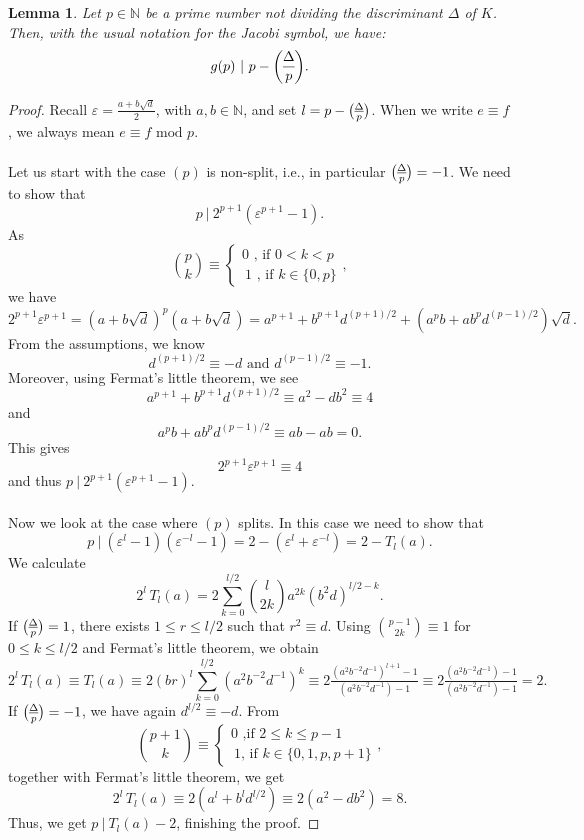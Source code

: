 \documentclass[11pt, a4paper]{amsart}
\newcommand{\ep}{\varepsilon}
\newcommand{\genlegendre}[4]{%
  \genfrac{(}{)}{}{#1}{#3}{#4}%
  \if\relax\detokenize{#2}\relax\else_{\!#2}\fi
}
\newcommand{\legendre}[3][]{\genlegendre{}{#1}{#2}{#3}}
\newcommand{\eq}[1]{\begin{equation}#1\end{equation}}
\theoremstyle{plain}
\newtheorem{lemma}{Lemma}[section]
\numberwithin{equation}{section}
\begin{document}
\begin{lemma}
\label{epsilonf}
Let $p \in \mathbb N$ be a prime number not dividing the discriminant $\Delta$ of $K$. Then, with the usual notation for the Jacobi symbol, we have: \eq{g(p) \ \vert \ p-\legendre{\Delta}{p}.}
\end{lemma}
\begin{proof}
Recall $\ep = \tfrac{a + b\sqrt{d} } 2$, with $a,b \in \mathbb N$, and set $l = p-\legendre{\Delta}{p}$. When we write $e\equiv f$, we always mean $e \equiv f \text{ mod $p$}$. \\ \\
Let us start with the case $(p)$ is non-split, i.e., in particular $\legendre{\Delta}{p} = -1$. We need to show that \eq{p \ | \ 2^{p+1}(\ep^{p+1}-1).} As \eq{\binom{p}{k} \equiv \left\{ \begin{array}{c} 0 \text{ , if $0 < k < p$} \\  \  1 \text{ , if $k \in \{0,p\}$}  \end{array}  \right. ,} we have \eq{2^{p+1} \ep^{p+1} = (a+b\sqrt{d} )^p(a+b\sqrt{d} ) = a^{p+1}+b^{p+1} d^{(p+1)/2} +(a^p b + a b^p d^{(p-1)/2} ) \sqrt{d}.} From the assumptions, we know \eq{d^{(p+1)/2} \equiv -d \text{ and } d^{(p-1)/2} \equiv -1 .} Moreover, using Fermat's little theorem, we see \eq{a^{p+1}+b^{p+1} d^{(p+1)/2} \equiv a^2 -d b^2 \equiv 4} and \eq{a^p b + a b^p d^{(p-1)/2} \equiv ab - ab = 0.} This gives \eq{2^{p+1}\ep^{p+1} \equiv 4 } and thus $p \ \vert \ 2^{p+1}(\ep^{p+1}-1)$. \\ \\
Now we look at the case where $(p)$ splits. In this case we need to show that \eq{p \ \vert \ (\ep^{l}-1) (\ep^{-l}-1) = 2 - (\ep^{l} + \ep^{-l}) = 2- T_l(a).} We calculate \eq{2^l \, T_l(a) = 2 \sum_{k=0}^{l/2} \binom{l}{2k}a^{2k} (b^2d)^{l/2-k}.} If $\legendre{\Delta}{p} = 1$, there exists $1\leq r \leq l/2$ such that $r^2 \equiv d$. Using $\binom{p-1}{2k} \equiv 1 $ for $0 \leq k \leq l/2$ and Fermat's little theorem, we obtain \eq{2^l \, T_l(a) \equiv T_l(a) \equiv 2 (br)^l \sum_{k=0}^{l / 2}(a^2b^{-2}d^{-1})^k \equiv 2 \tfrac{(a^2b^{-2}d^{-1})^{l+1}-1}{(a^2b^{-2}d^{-1})-1} \equiv 2 \tfrac{(a^2b^{-2}d^{-1})-1}{(a^2b^{-2}d^{-1})-1} = 2.} If $\legendre{\Delta}{p}=-1$, we have again $d^{l/2}\equiv -d $. From \eq{\binom{p+1}{k} \equiv \left\{ \begin{array}{c} 0 \text{ ,if $2 \leq k \leq p-1$} \\  \  1 \text{, if $k \in \{0,1,p,p+1\}$}  \end{array}  \right. ,} together with Fermat's little theorem, we get \eq{2^l \, T_l(a) \equiv 2(a^l+b^l d^{l/2}) \equiv 2(a^2 - d b^2 ) = 8 .} Thus, we get $p \ \vert \ T_l(a) - 2$, finishing the proof.
\end{proof}



\end{document}

